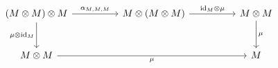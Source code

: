 \documentclass[border=6pt]{standalone}
\newcommand{\id}{\mathrm{id}}
\begin{document}
$
\begin{tikzcd}[column sep=huge, row sep=large]
  (M \otimes M) \otimes M \arrow[r, "\alpha_{M,M,M}"] \arrow[d, "\mu \otimes \id_M"'] & M \otimes (M \otimes M) \arrow[r, "\id_M \otimes \mu"] & M \otimes M \arrow[d, "\mu"] \\
  M \otimes M \arrow[rr, "\mu"'] & & M
\end{tikzcd}
$
\end{document}
